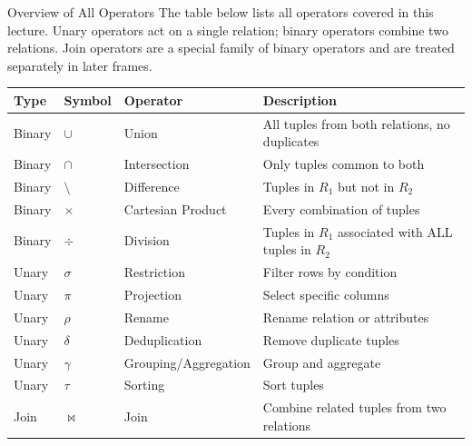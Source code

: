\begin{frame}{Overview of All Operators}
  The table below lists all operators covered in this lecture.  Unary
  operators act on a single relation; binary operators combine two
  relations.  Join operators are a special family of binary operators and
  are treated separately in later frames.

  \vspace{0.4em}
  \begin{center}
    \footnotesize
    \begin{tabular}{llll}
      \hline
      \textbf{Type} & \textbf{Symbol} & \textbf{Operator} & \textbf{Description} \\
      \hline
      Binary & $\cup$           & Union              & All tuples from both relations, no duplicates \\
      Binary & $\cap$           & Intersection       & Only tuples common to both \\
      Binary & $\setminus$      & Difference         & Tuples in $R_1$ but not in $R_2$ \\
      Binary & $\times$         & Cartesian Product  & Every combination of tuples \\
      Binary & $\div$           & Division           & Tuples in $R_1$ associated with ALL tuples in $R_2$ \\
      Unary  & $\sigma$         & Restriction        & Filter rows by condition \\
      Unary  & $\pi$            & Projection         & Select specific columns \\
      Unary  & $\rho$           & Rename             & Rename relation or attributes \\
      Unary  & $\delta$         & Deduplication      & Remove duplicate tuples \\
      Unary  & $\gamma$         & Grouping/Aggregation & Group and aggregate \\
      Unary  & $\tau$           & Sorting            & Sort tuples \\
      Join   & $\bowtie$        & Join               & Combine related tuples from two relations \\
      \hline
    \end{tabular}
  \end{center}
\end{frame}
